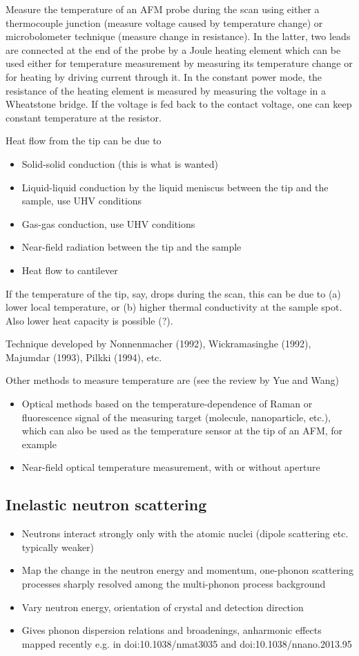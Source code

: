 Measure the temperature of an AFM probe during the scan using either a thermocouple junction (measure voltage caused by temperature change) or microbolometer technique (measure change in resistance). In the latter, two leads are connected at the end of the probe by a Joule heating element which can be used either for temperature measurement by measuring its temperature change or for heating by driving current through it. In the constant power mode, the resistance of the heating element is measured by measuring the voltage in a Wheatstone bridge. If the voltage is fed back to the contact voltage, one can keep constant temperature at the resistor. 

Heat flow from the tip can be due to
\begin{itemize}
 \item Solid-solid conduction (this is what is wanted)
 \item Liquid-liquid conduction by the liquid meniscus between the tip and the sample, use UHV conditions
 \item Gas-gas conduction, use UHV conditions
 \item Near-field radiation between the tip and the sample
 \item Heat flow to cantilever
\end{itemize}

If the temperature of the tip, say, drops during the scan, this can be due to (a) lower local temperature, or (b) higher thermal conductivity at the sample spot. Also lower heat capacity is possible (?). 

Technique developed by Nonnenmacher (1992), Wickramasinghe (1992), Majumdar (1993), Pilkki (1994), etc.

Other methods to measure temperature are (see the review by Yue and Wang)
\begin{itemize}
 \item Optical methods based on the temperature-dependence of Raman or fluorescence signal of the measuring target (molecule, nanoparticle, etc.), which can also be used as the temperature sensor at the tip of an AFM, for example
 \item Near-field optical temperature measurement, with or without aperture
\end{itemize}

\subsection{Inelastic neutron scattering}
 \begin{itemize}
  \item Neutrons interact strongly only with the atomic nuclei (dipole scattering etc. typically weaker)
  \item Map the change in the neutron energy and momentum, one-phonon scattering processes sharply resolved among the multi-phonon process background
  \item Vary neutron energy, orientation of crystal and detection direction
  \item Gives phonon dispersion relations and broadenings, anharmonic effects mapped recently e.g. in doi:10.1038/nmat3035 and doi:10.1038/nnano.2013.95
 \end{itemize}
\fi
